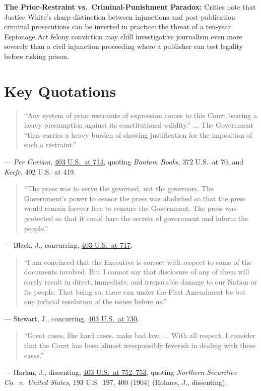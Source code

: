 \documentclass[12pt]{article}
\begin{document}
\textbf{The Prior-Restraint vs.\ Criminal-Punishment Paradox:} Critics note that Justice White's sharp distinction between injunctions and post-publication criminal prosecutions can be inverted in practice: the threat of a ten-year Espionage Act felony conviction may chill investigative journalism even more severely than a civil injunction proceeding where a publisher can test legality before risking prison.

\section{Key Quotations}
\begin{quote}
``Any system of prior restraints of expression comes to this Court bearing a heavy presumption against its constitutional validity.'' ... The Government ``thus carries a heavy burden of showing justification for the imposition of such a restraint.''
\end{quote}
\noindent --- \textit{Per Curiam}, \href{https://supreme.justia.com/cases/federal/us/403/713/}{403 U.S.\ at 714}, quoting \textit{Bantam Books}, 372 U.S.\ at 70, and \textit{Keefe}, 402 U.S.\ at 419.

\begin{quote}
``The press was to serve the governed, not the governors. The Government's power to censor the press was abolished so that the press would remain forever free to censure the Government. The press was protected so that it could bare the secrets of government and inform the people.''
\end{quote}
\noindent --- Black, J., concurring, \href{https://supreme.justia.com/cases/federal/us/403/713/}{403 U.S.\ at 717}.

\begin{quote}
``I am convinced that the Executive is correct with respect to some of the documents involved. But I cannot say that disclosure of any of them will surely result in direct, immediate, and irreparable damage to our Nation or its people. That being so, there can under the First Amendment be but one judicial resolution of the issues before us.''
\end{quote}
\noindent --- Stewart, J., concurring, \href{https://supreme.justia.com/cases/federal/us/403/713/}{403 U.S.\ at 730}.

\begin{quote}
``Great cases, like hard cases, make bad law. ... With all respect, I consider that the Court has been almost irresponsibly feverish in dealing with these cases.''
\end{quote}
\noindent --- Harlan, J., dissenting, \href{https://supreme.justia.com/cases/federal/us/403/713/}{403 U.S.\ at 752--753}, quoting \textit{Northern Securities Co.\ v.\ United States}, 193 U.S.\ 197, 400 (1904) (Holmes, J., dissenting).
\end{document}
